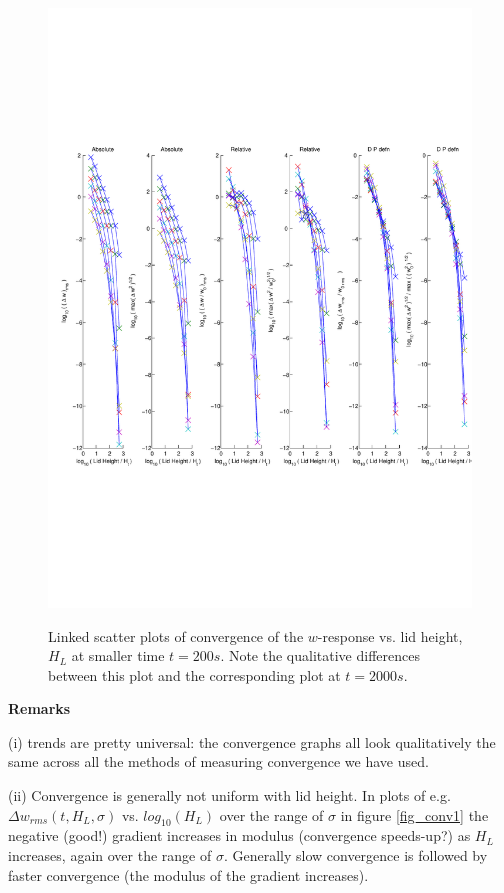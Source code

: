 \documentclass[12pt]{article}
\begin{document}
\begin{figure}[h]
\caption{Linked scatter plots of convergence of the $w$-response vs. lid height, $H_L$ at smaller time $t=200s$.
Note the qualitative differences between this plot and the corresponding plot at $t=2000s$. } 
\includegraphics[scale=0.8,angle=-0] {fig4d.pdf} 
\label{fig_conv4}
\end{figure}

{ \bf Remarks }

(i) trends are pretty universal: the convergence graphs all look qualitatively the same across all the methods of measuring convergence we have used. 

(ii) Convergence is generally not uniform with lid height. In plots of e.g. $\Delta w_{rms} (t,H_L,\sigma)$ vs. $log_{10} (H_L)$ over the range of $\sigma$ in figure \ref{fig_conv1}
the negative (good!) gradient increases in modulus (convergence speeds-up?) as $H_L$ increases, again over the range of $\sigma$. Generally slow convergence is followed by faster convergence (the modulus of the gradient increases).
\end{document}
